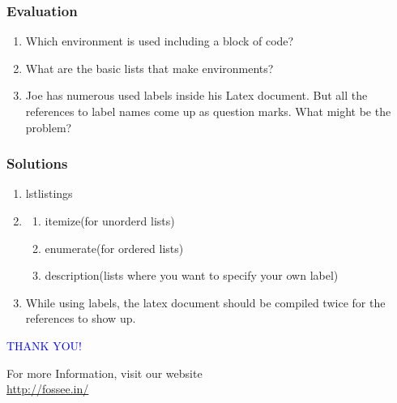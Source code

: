 \documentclass[14pt,compress]{beamer}
\begin{document}
\begin{frame}[fragile]
\frametitle{Evaluation}
\begin{enumerate}
\item Which environment is used including a block of code?
\item What are the basic lists that make environments?
\item Joe has numerous used labels inside his Latex document. But all the references to label names come up as question marks. What might be the problem? 
\end{enumerate}
\end{frame}
\begin{frame}

\frametitle{Solutions}
\begin{enumerate}
\item lstlistings
\vspace{15pt}
\item
\begin{enumerate} 
\item itemize(for unorderd lists) 
\item enumerate(for ordered lists)
\item description(lists where you want to specify your own label)
\end{enumerate}
\item While using labels, the latex document should be compiled twice for the references to show up.
\end{enumerate}
\end{frame}
\begin{frame}

\begin{block}{}
  \begin{center}
  \textcolor{blue}{\Large THANK YOU!} 
  \end{center}
  \end{block}
\begin{block}{}
  \begin{center}
    For more Information, visit our website\\
    \url{http://fossee.in/}
  \end{center}  
  \end{block}
\end{frame}
\end{document}
